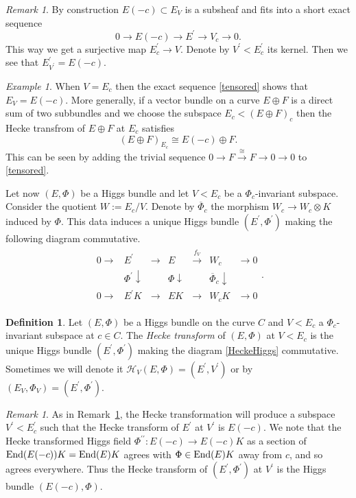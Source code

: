\documentclass[12pt]{article}
\numberwithin{equation}{section}
\theoremstyle{remark}
\newtheorem{remark}[theorem]{Remark}
\newtheorem{example}[theorem]{Example}
\theoremstyle{definition}
\newtheorem{definition}[theorem]{Definition}
\numberwithin{theorem}{section}
\def\beq{\begin{eqnarray}}
\def\eeq{\end{eqnarray}}
\def\calH{\mathcal{H}}
\newcommand{\End}{\textnormal{End}}
\renewcommand{\1}{\mathbbm{1}}
\begin{document}
\begin{remark} \label{remarkV}By construction $E(-c)\subset E_V$ is a subsheaf and fits into a short exact sequence $$0\to E(-c){\to} E^\prime{\to} V_c \to 0.$$ This way we get a surjective map $E^\prime_c\to V$. Denote by $V^\prime < E^\prime_c$ its kernel. 
	Then we see that $E^\prime_{V^\prime}=E(-c)$. 
\end{remark}

\begin{example}\label{heckebundle} When $V=E_c$ then the exact sequence \eqref{tensored} shows that $E_V=E(-c)$. More generally, if a vector bundle on a curve $E\oplus F$ is a direct sum of two subbundles  and we  choose the subspace $E_c<(E\oplus F)_c$ then the Hecke transfrom of $E\oplus F$ at $E_c$ satisfies $$(E\oplus F)_{E_c}\cong E(-c)
\oplus F.$$ This can be seen by adding the trivial sequence $0\rightarrow F\stackrel{\cong}{\rightarrow}F\to 0 \to 0$ to \eqref{tensored}.	\end{example}

Let now $(E,\Phi)$ be a Higgs bundle and let $V<E_c$ be a $\Phi_c$-invariant subspace. Consider the quotient $W:=E_c/V$. Denote by $\overline{\Phi}_c$ the morphism $W_c\to W_c\otimes K$ induced by $\Phi$.   This data induces a unique Higgs bundle $(E^\prime,\Phi^\prime)$ making the following diagram commutative.
\beq \label{HeckeHiggs} \begin{array}{ccccccc} 0 \to & E^\prime& {\to} &E& \stackrel{f_V}{\to} & W_c & \to 0 
	\\ & \Phi^\prime \downarrow &&\Phi \downarrow&& \overline{\Phi}_c\downarrow & \\ 0 \to & E^\prime K&\to &EK&\to& W_c K&\to 0 \end{array}.\eeq 

\begin{definition} Let $(E,\Phi)$ be a Higgs bundle on the curve $C$ and $V< E_c$ a $\Phi_c$-invariant subspace at $c\in C$. The {\em Hecke transform} of $(E,\Phi)$ at $V< E_c$ is the unique Higgs bundle $(E^\prime,\Phi^\prime)$ making the diagram \eqref{HeckeHiggs} commutative. Sometimes we will denote it $\calH_V(E,\Phi)=(E^\prime,V^\prime)$ or by $(E_V,\Phi_V)=(E^\prime,\Phi^\prime)$. 
\end{definition}

\begin{remark} \label{V'Higgs}As  in Remark~\ref{remarkV}, the Hecke transformation will produce a subspace $V^\prime<E^\prime_c$ such that the Hecke transform of $E^\prime$ at $V^\prime$ is $E(-c)$. We note that the Hecke transformed Higgs field $\Phi^{\prime\prime}:E(-c)\to E(-c)K$ as  a section of $\End(E(-c))K=\End(E)K$ agrees with $\Phi\in \End(E)K$ away from $c$, and so agrees everywhere. Thus the Hecke transform of $(E^\prime,\Phi^\prime)$ at $V^\prime$ is the Higgs bundle $(E(-c),\Phi)$. 
\end{remark}
\end{document}
